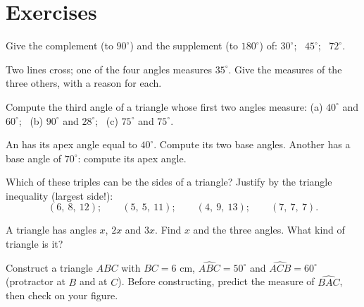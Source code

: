 \section{Exercises}

\begin{exercise}[$\star$]\label{exo:g7:triangles:1}
Give the complement (to $90^\circ$) and the supplement (to
$180^\circ$) of: $30^\circ$; \ $45^\circ$; \ $72^\circ$.
\end{exercise}

\begin{exercise}[$\star$]\label{exo:g7:triangles:2}
Two lines cross; one of the four angles measures $35^\circ$. Give the
measures of the three others, with a reason for each.
\end{exercise}

\begin{exercise}[$\star$]\label{exo:g7:triangles:3}
Compute the third angle of a triangle whose first two angles measure:
(a) $40^\circ$ and $60^\circ$; \
(b) $90^\circ$ and $28^\circ$; \
(c) $75^\circ$ and $75^\circ$.
\end{exercise}

\begin{exercise}[$\star$]\label{exo:g7:triangles:4}
An  has its apex angle equal to $40^\circ$. Compute
its two base angles. Another  has a base angle of
$70^\circ$: compute its apex angle.
\end{exercise}

\begin{exercise}[$\star$]\label{exo:g7:triangles:5}
Which of these triples can be the sides of a triangle? Justify by the
triangle inequality (largest side!):
\[
(6,\ 8,\ 12); \qquad
(5,\ 5,\ 11); \qquad
(4,\ 9,\ 13); \qquad
(7,\ 7,\ 7).
\]
\end{exercise}

\begin{exercise}[$\star$]\label{exo:g7:triangles:6}
A triangle has angles $x$, $2x$ and $3x$. Find $x$ and the three
angles. What kind of triangle is it?
\end{exercise}

\begin{exercise}[$\star$]\label{exo:g7:triangles:7}
Construct a triangle $ABC$ with $BC = 6$ cm,
$\widehat{ABC} = 50^\circ$ and $\widehat{ACB} = 60^\circ$ (protractor
at $B$ and at $C$). Before constructing, predict the measure of
$\widehat{BAC}$, then check on your figure.
\end{exercise}

